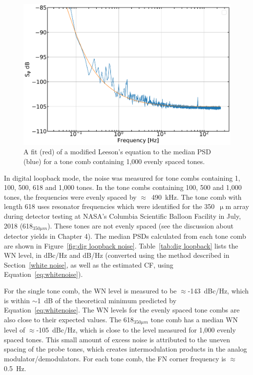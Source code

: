 \begin{figure}[!htbp]
\centering
\includegraphics[width=\textwidth]{figures/readout/sim/c1000_PSD_fit}
\caption[~A fit of a modified Leeson's equation to the median PSD for a tone comb containing 1,000 evenly spaced tones.]{A fit (red) of a modified Leeson's equation to the median PSD (blue) for a tone comb containing 1,000 evenly spaced tones.}
\label{fig:psd 1000 fit}
\end{figure}

In digital loopback mode, the noise was measured for tone combs containing 1, 100, 500, 618 and 1,000 tones. In the tone combs containing 100, 500 and 1,000 tones, the frequencies were evenly spaced by $\approx$~490~kHz. The tone comb with length 618 uses resonator frequencies which were identified for the 350~$\upmu$m array during detector testing at NASA's Columbia Scientific Balloon Facility in July, 2018 (618$_{350\mu m}$). These tones are not evenly spaced (see the discussion about detector yields in Chapter 4). The median PSDs calculated from each tone comb are shown in Figure~\ref{fig:dig loopback noise}. Table~\ref{tab:dig loopback} lists the WN level, in dBc/Hz and dB/Hz (converted using the method described in Section~\ref{white noise}, as well as the estimated CF, using Equation~\ref{eq:whitenoise}).

For the single tone comb, the WN level is measured to be $\approx$-143~dBc/Hz, which is within $\sim$1~dB of the theoretical minimum predicted by Equation~\ref{eq:whitenoise}. The WN levels for the evenly spaced tone combs are also close to their expected values. The 618$_{350\mu m}$ tone comb has a median WN level of $\approx$-105~dBc/Hz, which is close to the level measured for 1,000 evenly spaced tones. This small amount of excess noise is attributed to the uneven spacing of the probe tones, which creates intermodulation products in the analog modulator/demodulators. For each tone comb, the FN corner frequency is $\approx$0.5~Hz.

